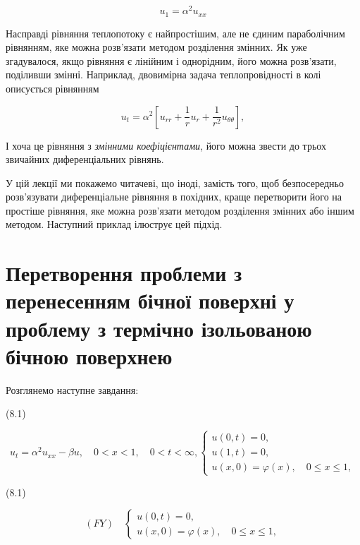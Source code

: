 \documentclass[
  ukrainian,
]{article}
\begin{document}
\[
u_1 = \alpha^2 u_{xx}
\]

Насправді рівняння теплопотоку є найпростішим, але не єдиним
параболічним рівнянням, яке можна розв'язати методом розділення змінних.
Як уже згадувалося, якщо рівняння є лінійним і однорідним, його можна
розв'язати, поділивши змінні. Наприклад, двовимірна задача
теплопровідності в колі описується рівнянням

\[
u_t = \alpha^2 \left[ u_{rr} + \frac{1}{r} u_r + \frac{1}{r^2} u_{\theta\theta} \right],
\]

І хоча це рівняння з \emph{змінними коефіцієнтами}, його можна звести до
трьох звичайних диференціальних рівнянь.

У цій лекції ми покажемо читачеві, що іноді, замість того, щоб
безпосередньо розв'язувати диференціальне рівняння в похідних, краще
перетворити його на простіше рівняння, яке можна розв'язати методом
розділення змінних або іншим методом. Наступний приклад ілюструє цей
підхід.

\section{Перетворення проблеми з перенесенням бічної поверхні у проблему
з термічно ізольованою бічною
поверхнею}\label{ux43fux435ux440ux435ux442ux432ux43eux440ux435ux43dux43dux44f-ux43fux440ux43eux431ux43bux435ux43cux438-ux437-ux43fux435ux440ux435ux43dux435ux441ux435ux43dux43dux44fux43c-ux431ux456ux447ux43dux43eux457-ux43fux43eux432ux435ux440ux445ux43dux456-ux443-ux43fux440ux43eux431ux43bux435ux43cux443-ux437-ux442ux435ux440ux43cux456ux447ux43dux43e-ux456ux437ux43eux43bux44cux43eux432ux430ux43dux43eux44e-ux431ux456ux447ux43dux43eux44e-ux43fux43eux432ux435ux440ux445ux43dux435ux44e}

Розглянемо наступне завдання:

(8.1)

\[
u_{t} = \alpha^{2}u_{xx} - \beta u, \quad 0 < x < 1, \quad 0 < t < \infty,
\begin{cases} u(0, t) = 0, \\ u(1, t) = 0, \\ u(x, 0) = \varphi(x), \quad 0 \le x \le 1, \end{cases}
\]

(8.1)

\[
(FY) \quad
\begin{cases} u(0, t) = 0, \\ u(x, 0) = \varphi(x), \quad 0 \le x \le 1, \end{cases}
\]
\end{document}
